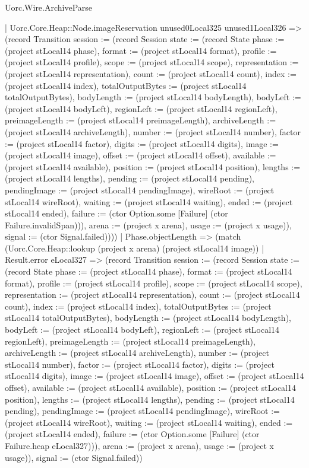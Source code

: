 \begin{lexlean}{Uorc.Wire.ArchiveParse}
\begin{semanticmodule}
{            | Uorc.Core.Heap::Node.imageReservation unused0Local325 unused1Local326 => (record Transition {session := (record Session {state := (record State {phase := (project stLocal14 phase), format := (project stLocal14 format), profile := (project stLocal14 profile), scope := (project stLocal14 scope), representation := (project stLocal14 representation), count := (project stLocal14 count), index := (project stLocal14 index), totalOutputBytes := (project stLocal14 totalOutputBytes), bodyLength := (project stLocal14 bodyLength), bodyLeft := (project stLocal14 bodyLeft), regionLeft := (project stLocal14 regionLeft), preimageLength := (project stLocal14 preimageLength), archiveLength := (project stLocal14 archiveLength), number := (project stLocal14 number), factor := (project stLocal14 factor), digits := (project stLocal14 digits), image := (project stLocal14 image), offset := (project stLocal14 offset), available := (project stLocal14 available), position := (project stLocal14 position), lengths := (project stLocal14 lengths), pending := (project stLocal14 pending), pendingImage := (project stLocal14 pendingImage), wireRoot := (project stLocal14 wireRoot), waiting := (project stLocal14 waiting), ended := (project stLocal14 ended), failure := (ctor Option.some [Failure] (ctor Failure.invalidSpan))}), arena := (project x arena), usage := (project x usage)}), signal := (ctor Signal.failed)})))
        | Phase.objectLength => (match (Uorc.Core.Heap::lookup (project x arena) (project stLocal14 image))
          | Result.error eLocal327 => (record Transition {session := (record Session {state := (record State {phase := (project stLocal14 phase), format := (project stLocal14 format), profile := (project stLocal14 profile), scope := (project stLocal14 scope), representation := (project stLocal14 representation), count := (project stLocal14 count), index := (project stLocal14 index), totalOutputBytes := (project stLocal14 totalOutputBytes), bodyLength := (project stLocal14 bodyLength), bodyLeft := (project stLocal14 bodyLeft), regionLeft := (project stLocal14 regionLeft), preimageLength := (project stLocal14 preimageLength), archiveLength := (project stLocal14 archiveLength), number := (project stLocal14 number), factor := (project stLocal14 factor), digits := (project stLocal14 digits), image := (project stLocal14 image), offset := (project stLocal14 offset), available := (project stLocal14 available), position := (project stLocal14 position), lengths := (project stLocal14 lengths), pending := (project stLocal14 pending), pendingImage := (project stLocal14 pendingImage), wireRoot := (project stLocal14 wireRoot), waiting := (project stLocal14 waiting), ended := (project stLocal14 ended), failure := (ctor Option.some [Failure] (ctor Failure.heap eLocal327))}), arena := (project x arena), usage := (project x usage)}), signal := (ctor Signal.failed)})
}
\end{semanticmodule}
\end{lexlean}

